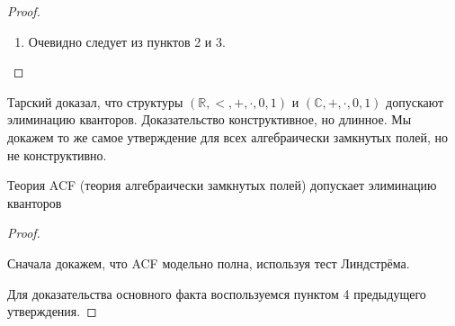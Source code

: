 \begin{proof}
\begin{enumerate}
\begin{proof}
           Тогда $\gamma=\bigvee\neg\delta_i(\overline{d})$ лежит в $\Gamma$. Значит $\mathbb{A}\models \gamma$, но по определению $\text{Diag}$ выполнено $\mathbb{A}\models \neg\gamma$. Противоречие
       \end{proof}
        
       Пусть $\mathbb{B}'$~— модель, удовлетворяющая утверждению. Рассмотрим её обеднение $\mathbb{B}$ до структуры $\sigma$. Существует единственное вложение $g: \mathbb{C}\rightarrow \mathbb{B}$, переводящее $d_i$ в $d_i'$.

       Наконец, воспользуемся условием $\circledast$. По определению, в $\mathbb{A}$ $\varphi(f(\overline{d}))$ ложно, а в $\mathbb{B}$ $\varphi(g(\overline{d}))$ истинно. Противоречие.

    \item Очевидно следует из пунктов 2 и 3.
    \end{enumerate}
\end{proof}


Тарский доказал, что структуры $(\mathbb{R}, <, +, \cdot, 0, 1)$ и $(\mathbb{C}, +, \cdot, 0, 1)$ допускают элиминацию кванторов. Доказательство конструктивное, но длинное. Мы докажем то же самое утверждение для всех алгебраически замкнутых полей, но не конструктивно.

\begin{exmpl}
    Теория ACF (теория алгебраически замкнутых полей) допускает элиминацию кванторов
\end{exmpl}

\begin{proof}\

    Сначала докажем, что ACF модельно полна, используя тест Линдстрёма.

    Для доказательства основного факта воспользуемся пунктом 4 предыдущего утверждения.
\end{proof}
